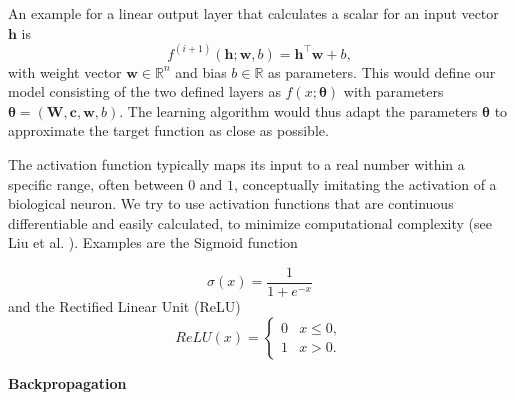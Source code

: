 An example for a linear output layer that calculates a scalar for an input vector $\mathbf{h}$ is
\begin{equation}
    f^{(i+1)}(\mathbf{h}; \mathbf{w},b)=\mathbf{h}^\top\mathbf{w}+b,
\end{equation}
with weight vector $\mathbf{w} \in \mathbb{R}^n$ and bias $b \in \mathbb{R}$ as parameters. This would define our model consisting of the two defined layers as $f(x;\boldsymbol{\theta})$ with parameters $\boldsymbol{\theta} = (\mathbf{W}, \mathbf{c}, \mathbf{w}, b)$. The learning algorithm would thus adapt the parameters $\boldsymbol{\theta}$ to approximate the target function as close as possible.

The activation function typically maps its input to a real number within a specific range, often between $0$ and $1$, conceptually imitating the activation of a biological neuron. We try to use activation functions that are continuous differentiable and easily calculated, to minimize computational complexity (see Liu et al. \cite{Liu2020}). Examples are the Sigmoid function

\begin{equation}
    \sigma (x)= \frac{1}{1+e^{-x}}
\end{equation}
and the Rectified Linear Unit (ReLU)
\begin{equation}
    ReLU(x)=\begin{cases}
        0 & x \leq 0, \\
        1 & x > 0.
    \end{cases}
\end{equation}

\textbf{Backpropagation}

